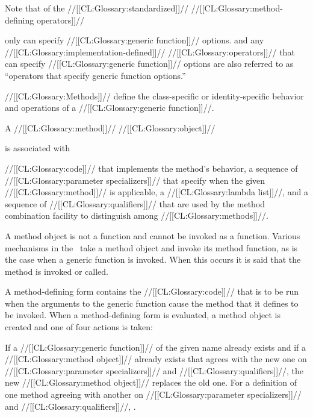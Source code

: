   


Note that of the //[[CL:Glossary:standardized]]// //[[CL:Glossary:method-defining operators]]//

only  can specify //[[CL:Glossary:generic function]]// options.  and any //[[CL:Glossary:implementation-defined]]// //[[CL:Glossary:operators]]// that can specify //[[CL:Glossary:generic function]]// options are also referred to as ``operators that specify generic function options.''

\endSubsection%

 

//[[CL:Glossary:Methods]]// define the class-specific or identity-specific behavior and operations of a //[[CL:Glossary:generic function]]//. 

A //[[CL:Glossary:method]]// //[[CL:Glossary:object]]// 

is associated with 

     //[[CL:Glossary:code]]// that implements the method's behavior,
     a sequence of //[[CL:Glossary:parameter specializers]]// 
       that specify when the given //[[CL:Glossary:method]]// is applicable,
     a //[[CL:Glossary:lambda list]]//,
 and a sequence of //[[CL:Glossary:qualifiers]]// that are used by the method combination
       facility to distinguish among //[[CL:Glossary:methods]]//.

A method object is not a function and cannot be invoked as a function.  Various mechanisms in the \OS\ take a method object and invoke its method function, as is the case when a generic function is invoked.  When this occurs it is said that the method is invoked or called.

A method-defining form contains the //[[CL:Glossary:code]]// that is to be run when the arguments to the generic function cause the method that it defines to be invoked.  When a method-defining form is evaluated, a method object is created and one of four actions is taken:

\beginlist

\itemitem{\bull} If a //[[CL:Glossary:generic function]]// of the given name already exists and if a //[[CL:Glossary:method object]]// already exists that agrees with the new one on //[[CL:Glossary:parameter specializers]]// and //[[CL:Glossary:qualifiers]]//, the new //[[CL:Glossary:method object]]// replaces the old one.  For a definition of one method agreeing with another on //[[CL:Glossary:parameter specializers]]// and //[[CL:Glossary:qualifiers]]//,  \seesection\SpecializerQualifierAgreement.


